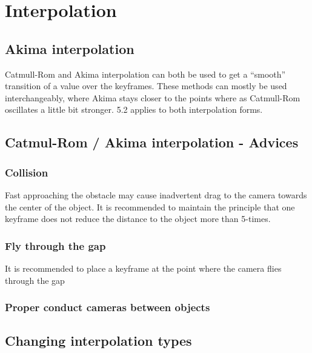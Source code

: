 \section{Interpolation}\label{interpolation}

\subsection{Akima interpolation}\label{akima-interpolation}

Catmull-Rom and Akima interpolation can both be used to get a ``smooth''
transition of a value over the keyframes. These methods can mostly be used
interchangeably, where Akima stays closer to the points where as Catmull-Rom
oscillates a little bit stronger. 5.2 applies to both interpolation forms.

\subsection{Catmul-Rom / Akima interpolation -
	Advices}\label{catmul-rom-akima-interpolation---advices}

\subsubsection{Collision}\label{collision}

Fast approaching the obstacle may cause inadvertent drag to the camera towards
the center of the object. It is recommended to maintain the principle that one
keyframe does not reduce the distance to the object more than 5-times.

\subsubsection{Fly through the gap}\label{fly-through-the-gap}

It is recommended to place a keyframe at the point where the camera flies
through the gap

\subsubsection{Proper conduct cameras between
	objects}\label{proper-conduct-cameras-between-objects}

\subsection{Changing interpolation types}\label{changing-interpolation-types}

